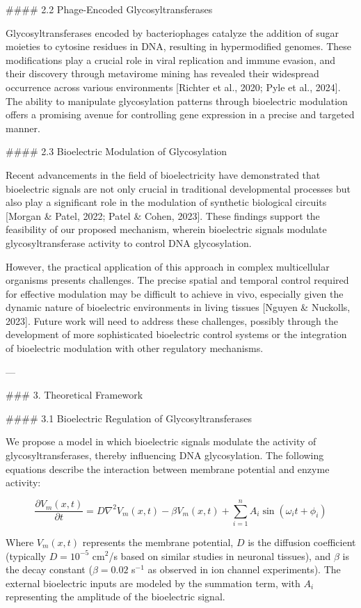 #### 2.2 Phage-Encoded Glycosyltransferases

Glycosyltransferases encoded by bacteriophages catalyze the addition of sugar moieties to cytosine residues in DNA, resulting in hypermodified genomes. These modifications play a crucial role in viral replication and immune evasion, and their discovery through metavirome mining has revealed their widespread occurrence across various environments [Richter et al., 2020; Pyle et al., 2024]. The ability to manipulate glycosylation patterns through bioelectric modulation offers a promising avenue for controlling gene expression in a precise and targeted manner.

#### 2.3 Bioelectric Modulation of Glycosylation

Recent advancements in the field of bioelectricity have demonstrated that bioelectric signals are not only crucial in traditional developmental processes but also play a significant role in the modulation of synthetic biological circuits [Morgan & Patel, 2022; Patel & Cohen, 2023]. These findings support the feasibility of our proposed mechanism, wherein bioelectric signals modulate glycosyltransferase activity to control DNA glycosylation.

However, the practical application of this approach in complex multicellular organisms presents challenges. The precise spatial and temporal control required for effective modulation may be difficult to achieve in vivo, especially given the dynamic nature of bioelectric environments in living tissues [Nguyen & Nuckolls, 2023]. Future work will need to address these challenges, possibly through the development of more sophisticated bioelectric control systems or the integration of bioelectric modulation with other regulatory mechanisms.

---

### 3. Theoretical Framework

#### 3.1 Bioelectric Regulation of Glycosyltransferases

We propose a model in which bioelectric signals modulate the activity of glycosyltransferases, thereby influencing DNA glycosylation. The following equations describe the interaction between membrane potential and enzyme activity:

\[
\frac{\partial V_m(x,t)}{\partial t} = D \nabla^2 V_m(x,t) - \beta V_m(x,t) + \sum_{i=1}^{n} A_i \sin(\omega_i t + \phi_i)
\]

Where \(V_m(x,t)\) represents the membrane potential, \(D\) is the diffusion coefficient (typically \(D = 10^{-5}\) cm\(^2\)/s based on similar studies in neuronal tissues), and \(\beta\) is the decay constant (\(\beta = 0.02\) s\(^{-1}\) as observed in ion channel experiments). The external bioelectric inputs are modeled by the summation term, with \(A_i\) representing the amplitude of the bioelectric signal.

